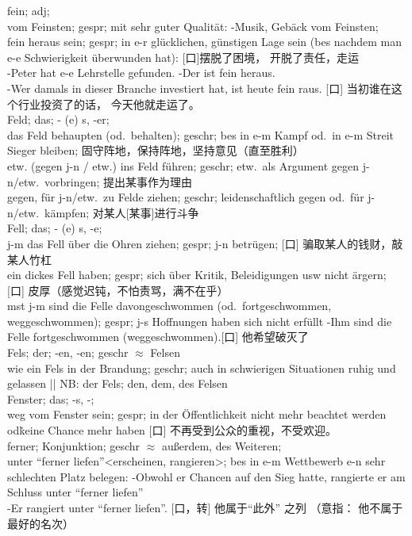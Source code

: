 \noindent
fein; adj; \\
vom Feinsten; gespr; mit sehr guter Qualit\"at: -Musik, Geb\"ack vom Feinsten;\\
fein heraus sein; gespr; in e-r gl\"ucklichen, g\"unstigen Lage sein (bes nachdem man e-e Schwierigkeit \"uberwunden hat): [口]摆脱了困境， 开脱了责任，走运\\
-Peter hat e-e Lehrstelle gefunden. -Der ist fein heraus.\\
-Wer damals in dieser Branche investiert hat, ist heute fein raus. [口] 当初谁在这个行业投资了的话， 今天他就走运了。\\

\noindent
Feld; das; \-- (e) s, -er;\\
das Feld behaupten (od.\ behalten); geschr; bes in e-m Kampf od.\ in e-m Streit Sieger bleiben; 固守阵地，保持阵地，坚持意见（直至胜利）\\
etw. (gegen j-n / etw.) ins Feld f\"uhren; geschr; etw.\ als Argument gegen j-n/etw.\ vorbringen; 提出某事作为理由\\
gegen, f\"ur j-n/etw.\ zu Felde ziehen; geschr; leidenschaftlich gegen od.\ f\"ur j-n/etw.\ k\"ampfen; 对某人[某事]进行斗争\\

\noindent
Fell; das; \-- (e) s, -e; \\
j-m das Fell \"uber die Ohren ziehen; gespr; j-n betr\"ugen; [口] 骗取某人的钱财，敲某人竹杠\\
ein dickes Fell haben; gespr; sich \"uber Kritik, Beleidigungen usw nicht \"argern; [口] 皮厚（感觉迟钝，不怕责骂，满不在乎）\\
mst j-m sind die Felle davongeschwommen (od.\ fortgeschwommen, weggeschwommen); gespr; j-s Hoffnungen haben sich nicht erf\"ullt -Ihm sind die Felle fortgeschwommen (weggeschwommen).[口] 他希望破灭了 \\

\noindent
Fels; der; -en, -en; geschr $\approx$ Felsen\\
wie ein Fels in der Brandung; geschr; auch in schwierigen Situationen ruhig und gelassen || NB: der Fels; den, dem, des Felsen\\

\noindent
Fenster; das; -s, -; \\
weg vom Fenster sein; gespr; in der \"Offentlichkeit nicht mehr beachtet werden od\. keine Chance mehr haben [口] 不再受到公众的重视，不受欢迎。\\

\noindent
ferner; Konjunktion; geschr $\approx$ au\ss{}erdem, des Weiteren; \\
unter ``ferner liefen''<erscheinen, rangieren>; bes in e-m Wettbewerb e-n sehr schlechten Platz belegen: -Obwohl er Chancen auf den Sieg hatte, rangierte er am Schluss unter ``ferner liefen'' \\
-Er rangiert unter ``ferner liefen''. [口，转] 他属于``此外'' 之列 （意指： 他不属于最好的名次）\\

